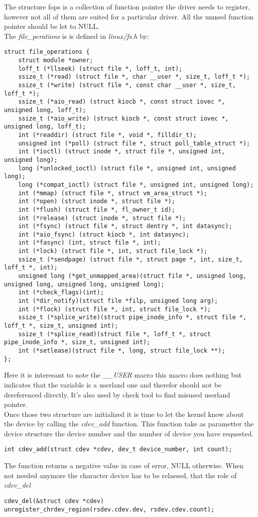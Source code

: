 \documentclass[11pt]{report}
\begin{document}
The structure fops is a collection of function pointer the driver needs to
register, however not all of them are suited for a particular driver. All the
unused function pointer should be let to NULL.\\
The {\it file\_perations} is is defined in {\it linux/fs.h} by:
\begin{lstlisting}
struct file_operations {
	struct module *owner;
	loff_t (*llseek) (struct file *, loff_t, int);
	ssize_t (*read) (struct file *, char __user *, size_t, loff_t *);
	ssize_t (*write) (struct file *, const char __user *, size_t, loff_t *);
	ssize_t (*aio_read) (struct kiocb *, const struct iovec *, unsigned long, loff_t);
	ssize_t (*aio_write) (struct kiocb *, const struct iovec *, unsigned long, loff_t);
	int (*readdir) (struct file *, void *, filldir_t);
	unsigned int (*poll) (struct file *, struct poll_table_struct *);
	int (*ioctl) (struct inode *, struct file *, unsigned int, unsigned long);
	long (*unlocked_ioctl) (struct file *, unsigned int, unsigned long);
	long (*compat_ioctl) (struct file *, unsigned int, unsigned long);
	int (*mmap) (struct file *, struct vm_area_struct *);
	int (*open) (struct inode *, struct file *);
	int (*flush) (struct file *, fl_owner_t id);
	int (*release) (struct inode *, struct file *);
	int (*fsync) (struct file *, struct dentry *, int datasync);
	int (*aio_fsync) (struct kiocb *, int datasync);
	int (*fasync) (int, struct file *, int);
	int (*lock) (struct file *, int, struct file_lock *);
	ssize_t (*sendpage) (struct file *, struct page *, int, size_t, loff_t *, int);
	unsigned long (*get_unmapped_area)(struct file *, unsigned long, unsigned long, unsigned long, unsigned long);
	int (*check_flags)(int);
	int (*dir_notify)(struct file *filp, unsigned long arg);
	int (*flock) (struct file *, int, struct file_lock *);
	ssize_t (*splice_write)(struct pipe_inode_info *, struct file *, loff_t *, size_t, unsigned int);
	ssize_t (*splice_read)(struct file *, loff_t *, struct pipe_inode_info *, size_t, unsigned int);
	int (*setlease)(struct file *, long, struct file_lock **);
};
\end{lstlisting}
Here it is interesant to note the {\it \_\_USER} macro this macro does nothing
but indicates that the variable is a userland one and therefor should not  be
dereferenced directly. It's also used by check tool to find misused userland
pointer.\\
Once those two structure are initialized it is time to let the kernel know
about the device by calling the {\it cdev\_add} function. This function take as
parametter the device structure the device number  and the number of device you
have requested.
\begin{lstlisting}
int cdev_add(struct cdev *cdev, dev_t device_number, int count);
\end{lstlisting}
The function returns a negative value in case of error, NULL otherwise.
When not needed anymore the character device has to be relaesed, that the role of  {\it
cdev\_del}
\begin{lstlisting}
cdev_del(&struct cdev *cdev)
unregister_chrdev_region(rsdev.cdev.dev, rsdev.cdev.count);
\end{lstlisting}
\end{document}
